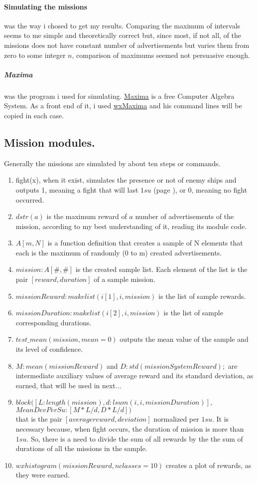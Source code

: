 \documentclass[]{article}
\begin{document}
\paragraph{Simulating the missions} was the way i chosed to get my results. Comparing the maximum of intervals seems to me simple and theoretically correct but, since most, if not all, of the missions does not have constant number of advertisements but varies them from zero to some integer $n$, comparison of maximums seemed not persuasive enough.
\subparagraph*{Maxima} was the program i used for simulating. \hyperref{https://maxima.sourceforge.io/}{}{}{Maxima} is a free Computer Algebra System. As a front end of it, i used \hyperref{https://wxmaxima-developers.github.io/wxmaxima/}{}{}{wxMaxima} and his command lines will be copied in each case.  
\subsection{Mission modules.}
Generally the missions are simulated by about ten steps or commands.
\begin{enumerate}
	\item fight(x), when it exist, simulates the presence or not of enemy ships and outputs 1, meaning a fight that will last $1su$ (page \pageref{fight_duration}), or 0, meaning no fight occurred.
	\item $dstr(a)$ is the maximum reward of $a$ number of advertisements of the mission, according to my best understanding of it, reading its module code.
	\item $A[m,N]$ is a function definition that creates a sample of N elements that each is the maximum of randomly (0 to m) created advertisements.
	\item $mission:A[\#,\#]$ is the created sample list. Each element of the list is the pair $[reward, duration]$ of a sample mission.
	\item $missionReward:makelist(i[1], i, mission)$ is the list of sample rewards.
	\item $missionDuration:makelist(i[2], i, mission)$  is the list of sample corresponding  durations. 
	\item $test\_mean(mission, mean=0)$ outputs the mean value of the sample and its level of confidence.
	\item $M:mean(missionReward)$ and $D:std(missionSystemReward);$ are intermediate auxiliary values of average reward and its standard deviation, as earned, that will be used in next$\dots$
	\item $block ([L:length(mission), d:lsum(i, i, missionDuration)],$\\$    
	MeanDevPerSu:[M*L/d, D*L/d])$\\ that is the pair $[average reward, deviation]$ normalized per $1su.$ It is necessary because, when fight occurs, the duration of mission is more than $1su$. So, there is a need to divide the sum of all rewards by the the sum of durations of all the missions in the sample. 
	\item $wxhistogram(missionReward, nclasses=10)$ creates a plot of rewards, as they were earned.
\end{enumerate}
\end{document}
